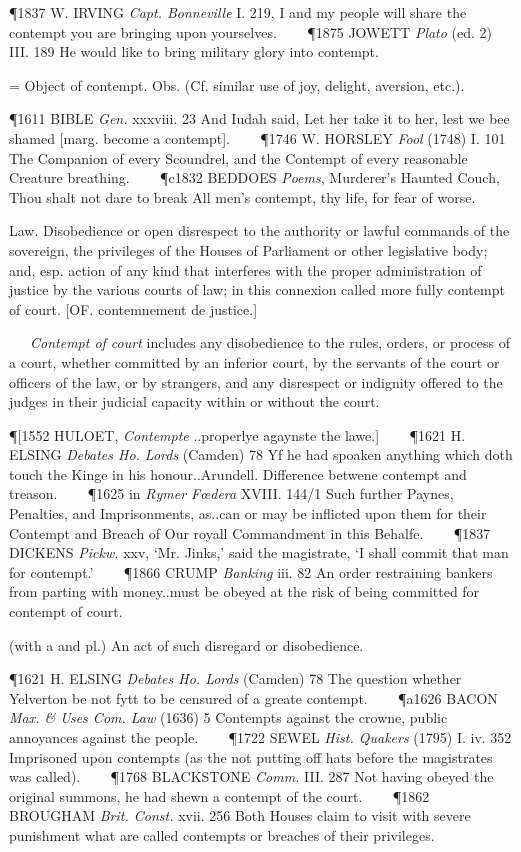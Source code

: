 \begin{description}[wide, labelwidth=!, labelindent=0pt]
\begin{myenumerate}
\P 1837 W. IRVING  \textit{Capt. Bonneville} I. 219, I and my people will share the contempt you are bringing upon yourselves.    
\P 1875 JOWETT  \textit{Plato} (ed. 2) III. 189 He would like to bring military glory into contempt.

 = Object of contempt. Obs. (Cf. similar use of joy, delight, aversion, etc.).

\P 1611 BIBLE  \textit{Gen.} xxxviii. 23 And Iudah said, Let her take it to her, lest we bee shamed [marg. become a contempt].    
\P 1746 W. HORSLEY  \textit{Fool} (1748) I. 101 The Companion of every Scoundrel, and the Contempt of every reasonable Creature breathing.    
\P c1832 BEDDOES  \textit{Poems}, Murderer's Haunted Couch, Thou shalt not dare to break All men's contempt, thy life, for fear of worse.

 Law. Disobedience or open disrespect to the authority or lawful commands of the sovereign, the privileges of the Houses of Parliament or other legislative body; and, esp. action of any kind that interferes with the proper administration of justice by the various courts of law; in this connexion called more fully contempt of court. [OF. contemnement de justice.]

   \textit{Contempt of court} includes any disobedience to the rules, orders, or process of a court, whether committed by an inferior court, by the servants of the court or officers of the law, or by strangers, and any disrespect or indignity offered to the judges in their judicial capacity within or without the court.

\P [1552 HULOET,  \textit{Contempte} ..properlye agaynste the lawe.]    
\P 1621 H. ELSING  \textit{Debates Ho. Lords} (Camden) 78 Yf he had spoaken anything which doth touch the Kinge in his honour..Arundell. Difference betwene contempt and treason.    
\P 1625 in  \textit{Rymer Fœdera} XVIII. 144/1 Such further Paynes, Penalties, and Imprisonments, as..can or may be inflicted upon them for their Contempt and Breach of Our royall Commandment in this Behalfe.    
\P 1837 DICKENS  \textit{Pickw.} xxv, ‘Mr. Jinks,’ said the magistrate, ‘I shall commit that man for contempt.’    
\P 1866 CRUMP  \textit{Banking} iii. 82 An order restraining bankers from parting with money..must be obeyed at the risk of being committed for contempt of court.

 (with a and pl.) An act of such disregard or disobedience.

\P 1621 H. ELSING  \textit{Debates Ho. Lords} (Camden) 78 The question whether Yelverton be not fytt to be censured of a greate contempt.    
\P a1626 BACON  \textit{Max. \& Uses Com. Law} (1636) 5 Contempts against the crowne, public annoyances against the people.    
\P 1722 SEWEL  \textit{Hist. Quakers} (1795) I. iv. 352 Imprisoned upon contempts (as the not putting off hats before the magistrates was called).    
\P 1768 BLACKSTONE  \textit{Comm.} III. 287 Not having obeyed the original summons, he had shewn a contempt of the court.    
\P 1862 BROUGHAM  \textit{Brit. Const.} xvii. 256 Both Houses claim to visit with severe punishment what are called contempts or breaches of their privileges.


\end{myenumerate}
\end{description}
